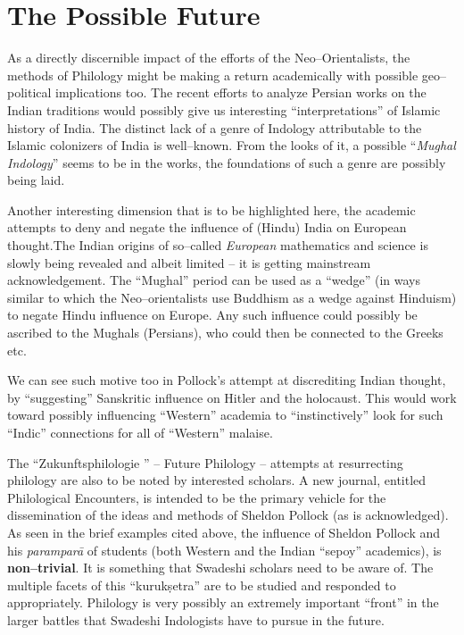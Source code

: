 \vskip -6pt


\section*{The Possible Future}

\vskip -6pt

As a directly discernible impact of the efforts of the Neo–Orientalists, the methods of Philology might be making a return academically with possible geo–political implications too. The recent efforts to analyze Persian works on the Indian traditions would possibly give us interesting “interpretations” of Islamic history of India. The distinct lack of a genre of Indology attributable to the Islamic colonizers of India is well–known. From the looks of it, a possible “\textit{Mughal Indology}” seems to be in the works, the foundations of such a genre are possibly being laid.

Another interesting dimension that is to be highlighted here, the academic attempts to deny and negate the influence of (Hindu) India on European thought.The Indian origins of so–called \textit{European} mathematics and science is slowly being revealed and albeit limited – it is getting mainstream acknowledgement. The “Mughal” period can be used as a “wedge” (in ways similar to which the Neo–orientalists use Buddhism as a wedge against Hinduism) to negate Hindu influence on Europe. Any such influence could possibly be ascribed to the Mughals (Persians), who could then be connected to the Greeks etc.

We can see such motive too in Pollock’s attempt at discrediting Indian thought, by “suggesting” Sanskritic influence on Hitler and the holocaust. This would work toward possibly influencing “Western” academia to “instinctively” look for such “Indic” connections for all of “Western” malaise. 

The “Zukunftsphilologie ” – Future Philology – attempts at resurrecting philology are also to be noted by interested scholars. A new journal, entitled Philological Encounters, is intended to be the primary vehicle for the dissemination of the ideas and methods of Sheldon Pollock (as is acknowledged). As seen in the brief examples cited above, the influence of Sheldon Pollock and his \textit{paramparā} of students (both Western and the Indian “sepoy” academics), is \textbf{non–trivial}. It is something that Swadeshi scholars need to be aware of. The multiple facets of this “kurukṣetra” are to be studied and responded to appropriately. Philology is very possibly an extremely important “front” in the larger battles that Swadeshi Indologists have to pursue in the future.

